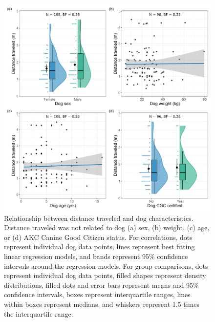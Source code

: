 \documentclass[
  doc]{apa6}
\begin{document}
\begin{figure}

{\centering \includegraphics[width=0.95\linewidth]{figures/dog_characteristics} 

}

\caption{Relationship between distance traveled and dog characteristics. Distance traveled was not related to dog (a) sex, (b) weight, (c) age, or (d) AKC Canine Good Citizen status. For correlations, dots represent individual dog data points, lines represent best fitting linear regression models, and bands represent 95\% confidence intervals around the regression models. For group comparisons, dots represent individual dog data points, filled shapes represent density distributions, filled dots and error bars represent means and 95\% confidence intervals, boxes represent interquartile ranges, lines within boxes represent medians, and whiskers represent 1.5 times the interquartile range. }\label{fig:dog-char}
\end{figure}
\end{document}
